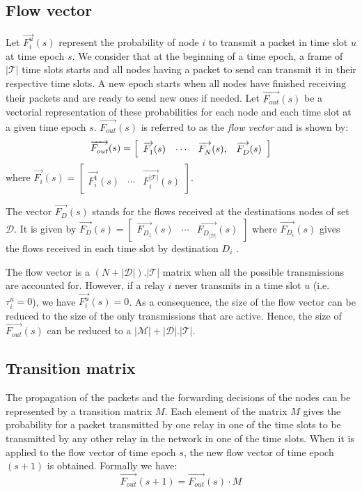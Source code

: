 \documentclass[a4paper]{article}
\newcommand{\T}{\mathcal{T}}
\newcommand{\M}{\mathcal{M}}
\newcommand{\D}{\mathcal{D}}
\newcommand{\Fout}[3]{\overrightarrow{ F_{#1}^{#2}}(#3)}
\newcommand{\Mmatrix}{M}
\begin{document}
  
\subsection{Flow vector}
Let $\Fout{i}{u}{s}$ represent the probability of node $i$ to transmit a packet in time slot $u$ at time epoch $s$. We consider that at the beginning of a time epoch, a frame of $|\T|$ time slots starts and all nodes having a packet to send can transmit it in their respective time slots. A new epoch starts when all nodes have finished receiving their packets and are ready to send new ones if needed. 
Let $\Fout{out}{}{s}$ be a vectorial representation of these probabilities for each node and each time slot at a given time epoch $s$. 
$\Fout{out}{}{s}$ is referred to as the \emph{flow vector} and is shown by:
\[
\Fout{out}{}{s} = 
\left[ 
 	\begin{array}{c c c  c}
		\Fout{1}{}{s} & 
		\cdots  & 
		\Fout{N}{}{s}, &
		\Fout{D}{}{s}\\
 	\end{array}
\right]
\]
\noindent where $\overrightarrow{F_i}(s) = \left[ \begin{array}{ccc} \Fout{i}{1}{s} & \cdots & \Fout{i}{|\T|}{s} \end{array} \right]$.

The vector $\Fout{D}{}{s}$ stands for the flows received at the destinations nodes of set $\D$. 
It is given by $\Fout{D}{}{s}=\left[ \begin{array}{ccc} \Fout{D_1}{}{s} & \cdots & \Fout{D_{|\D|}}{}{s} \end{array} \right]$ where $\Fout{D_i}{}{s}$ gives the flows received in each time slot by destination $D_i$ .

The flow vector is a $(N+|\D|).|\T|$ matrix when all the possible transmissions are accounted for. However, if a relay $i$ never transmits in a time slot $u$ (i.e. $\tau_i^u=0$), we have $\Fout{i}{u}{s}=0$.    
As a consequence, the size of the flow vector can be reduced to the size of the only transmissions that are active. Hence, the size of $\Fout{out}{}{s}$ can be reduced to a $|\M|+|\D|.|\T|$.

\subsection{Transition matrix}
The propagation of the packets and the forwarding decisions of the nodes can be represented by a transition matrix $M$.
Each element of the matrix $M$ gives the probability for a packet transmitted by one relay in one of the time slots to be transmitted by any other relay in the network in one of the time slots.   
When it is applied to the flow vector of time epoch $s$, the new flow vector of time epoch $(s+1)$ is obtained. Formally we have:
\[ \Fout{out}{}{s+1} = \Fout{out}{}{s}\cdot \Mmatrix
\]  
\end{document}
